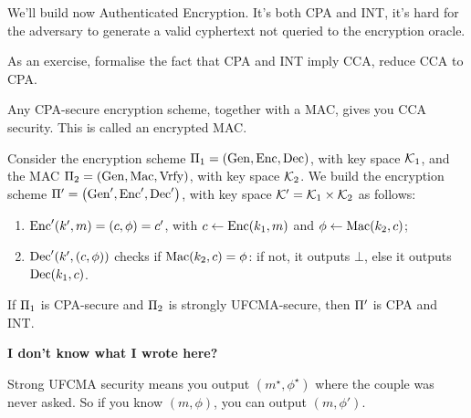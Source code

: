 We'll build now Authenticated Encryption.
It's both \ac{CPA} and \ac{INT}, \ie it's hard for the adversary to generate a valid cyphertext not queried to the encryption oracle.

As an exercise, formalise the fact that \ac{CPA} and \ac{INT} imply \ac{CCA}, \ie reduce \ac{CCA} to \ac{CPA}.

Any \ac{CPA}-secure encryption scheme, together with a \ac{MAC}, gives you \ac{CCA} security.
This is called an encrypted \ac{MAC}.

\begin{construction}
	Consider the encryption scheme $\SKESchemeTuple[1]$, with key space $\K_1$, and the \ac{MAC} $\GenericMACSchemeTuple[2]$, with key space $\K_2$.
	We build the encryption scheme $\CCASchemeTuple$, with key space $\K' = \K_1 \times \K_2$ as follows:
	\begin{enumerate}
		\item $\CCAEnc(k', m) = (c, \phi) = c'$, with $c \from \SKEEnc(k_1, m)$ and $\phi \from \GenericMac(k_2, c)$;
		\item $\CCADec(k', (c, \phi))$ checks if $\GenericMac(k_2, c) = \phi$: if not, it outputs $\bot$, else it outputs $\SKEDec(k_1, c)$. \qedhere
	\end{enumerate}
\end{construction}

\begin{theorem} \label{thm:cpa-int-encrypted-mac}
	If $\SKEScheme[1]$ is \ac{CPA}-secure and $\GenericMACScheme[2]$ is strongly \ac{UFCMA}-secure, then $\CCAScheme$ is \ac{CPA} and \ac{INT}.
\end{theorem}

	{\bfseries I don't know what I wrote here?}

	Strong \ac{UFCMA} security means you output $(m^{\star}, \phi^{\star})$ where the couple was never asked.
	So if you know $(m, \phi)$, you can output $(m, \phi')$.



